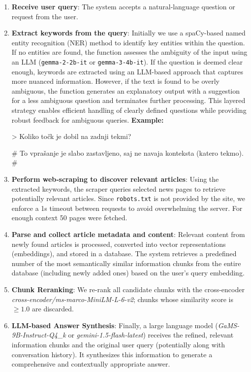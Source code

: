 \documentclass[fleqn,moreauthors,10pt]{ds_report}
\begin{document}
\begin{enumerate}
  \item \textbf{Receive user query}:  
    The system accepts a natural‑language question or request from the user.
  \item \textbf{Extract keywords from the query}:  
   Initially we use a spaCy-based named entity recognition (NER) method to identify key entities within the question. If no entities are found, the function assesses the ambiguity of the input using an LLM (\texttt{gemma-2-2b-it} or \texttt{gemma-3-4b-it}). If the question is deemed clear enough, keywords are extracted using an LLM-based approach that captures more nuanced information. However, if the text is found to be overly ambiguous, the function generates an explanatory output with a suggestion for a less ambiguous question and terminates further processing. This layered strategy enables efficient handling of clearly defined questions while providing robust feedback for ambiguous queries.
  \textbf{Example:}

   > Koliko točk je dobil na zadnji tekmi?

   \# To vprašanje je slabo zastavljeno, saj ne navaja konteksta (katero tekmo). \#
  
  \item \textbf{Perform web‑scraping to discover relevant articles}:  
    Using the extracted keywords, the scraper queries selected news pages to retrieve potentially relevant articles. Since \texttt{robots.txt} is not provided by the site, we enforce a 1s timeout between requests to avoid overwhelming the server. For enough context 50 pages were fetched.
  
  \item \textbf{Parse and collect article metadata and content}:  
    Relevant content from newly found articles is processed, converted into vector representations (embeddings), and stored in a database. The system retrieves a predefined number of the most semantically similar information chunks from the entire database (including newly added ones) based on the user's query embedding.

    \item \textbf{Chunk Reranking}: We re-rank all candidate chunks with the cross-encoder \textit{cross-encoder/ms-marco-MiniLM-L-6-v2}; chunks whose similarity score is $\ge 1.0$ are discarded.

    \item \textbf{LLM-based Answer Synthesis}: Finally, a large language model (\textit{GaMS-9B-Instruct-Q4\_k} or \textit{gemini-1.5-flash-latest}) receives the refined, relevant information chunks and the original user query (potentially along with conversation history). It synthesizes this information to generate a comprehensive and contextually appropriate answer.


\end{enumerate}
\end{document}
